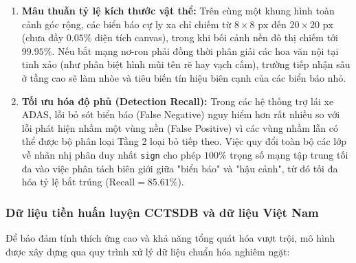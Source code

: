 \begin{enumerate}
    \item \textbf{Mâu thuẫn tỷ lệ kích thước vật thể:} Trên cùng một khung hình toàn cảnh góc rộng, các biển báo cự ly xa chỉ chiếm từ $8 \times 8\text{ px}$ đến $20 \times 20\text{ px}$ (chưa đầy $0.05\%$ diện tích canvas), trong khi bối cảnh nền đô thị chiếm tới $99.95\%$. Nếu bắt mạng nơ-ron phải đồng thời phân giải các hoa văn nội tại tinh xảo (như phân biệt hình mũi tên rẽ hay vạch cấm), trường tiếp nhận sâu ở tầng cao sẽ làm nhòe và tiêu biến tín hiệu biên cạnh của các biển báo nhỏ.
    \item \textbf{Tối ưu hóa độ phủ (Detection Recall):} Trong các hệ thống trợ lái xe ADAS, lỗi bỏ sót biển báo (False Negative) nguy hiểm hơn rất nhiều so với lỗi phát hiện nhầm một vùng nền (False Positive) vì các vùng nhầm lẫn có thể được bộ phân loại Tầng 2 loại bỏ tiếp theo. Việc quy đổi toàn bộ các lớp về nhãn nhị phân duy nhất \texttt{sign} cho phép $100\%$ trọng số mạng tập trung tối đa vào việc phân tách biên giới giữa "biển báo" và "hậu cảnh", từ đó tối đa hóa tỷ lệ bắt trúng ($\text{Recall} = 85.61\%$).
\end{enumerate}

\subsubsection{Dữ liệu tiền huấn luyện CCTSDB và dữ liệu Việt Nam}
\label{subsubsec:pretrain_cctsdb_vn}

Để bảo đảm tính thích ứng cao và khả năng tổng quát hóa vượt trội, mô hình được xây dựng qua quy trình xử lý dữ liệu chuẩn hóa nghiêm ngặt:

